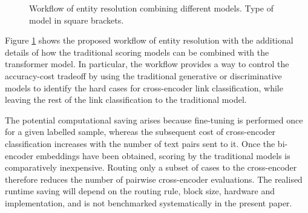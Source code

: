 \begin{figure}[ht]
\centering
{}
\caption{Workflow of entity resolution combining different models. Type of model in
square brackets.}
\label{fig:combined-workflow}
\end{figure}

Figure \ref{fig:combined-workflow} shows the proposed workflow of entity
resolution with the additional details of how the traditional scoring models can be
combined with the transformer model. In particular, the workflow provides a way to
control the accuracy-cost tradeoff by using the traditional generative or
discriminative models to identify the hard cases for cross-encoder link
classification, while leaving the rest of the link classification to the traditional
model.

The potential computational saving arises because fine-tuning is performed once
for a given labelled sample, whereas the subsequent cost of cross-encoder
classification increases with the number of text pairs sent to it. Once the
bi-encoder embeddings have been obtained, scoring by the traditional models is
comparatively inexpensive. Routing only a subset of cases to the cross-encoder
therefore reduces the number of pairwise cross-encoder evaluations.  The realised
runtime saving will depend on the routing rule, block size, hardware and
implementation, and is not benchmarked systematically in the present paper.

